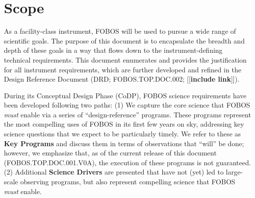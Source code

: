 \documentclass[11pt,a4paper,twoside,onecolumn,openany,final,oldfontcommands]{memoir}
\newcommand{\project}{FOBOS}
\newcommand{\wbs}{TOP}
\newcommand{\doctype}{DOC}
\newcommand{\docnumber}{001}
\newcommand{\docversion}{0A}
\newcommand{\docsysnum}{{\project}.{\wbs}.{\doctype}.{\docnumber}.V{\docversion}}
\newcommand{\edit}[2][todo]{{\color{#1}[[{\bf #2}]]}}
\begin{document}



\section{Scope}

As a facility-class instrument, FOBOS will be used to pursue a wide range of scientific goals.  The purpose of this document is to encapsulate the breadth and depth of these goals in a way that flows down to the instrument-defining technical requirements.  This document enumerates and provides the justification for all instrument requirements, which are further developed and refined in the Design Reference Document (DRD; FOBOS.TOP.DOC.002; \edit{include link}).

During its Conceptual Design Phase (CoDP), FOBOS science requirements have been developed following two paths: (1) We capture the core science that FOBOS {\it must} enable via a series of  ``design-reference'' programs.  These programs represent the most compelling uses of FOBOS in its first few years on sky, addressing key science questions that we expect to be particularly timely.  We refer to these as {\bf Key Programs} and discuss them in terms of observations that ``will'' be done; however, we emphasize that, as of the current release of this document (\docsysnum), the execution of these programs is not guaranteed.  (2) Additional {\bf Science Drivers} are presented that have not (yet) led to large-scale observing programs, but also represent compelling science that FOBOS {\it must} enable.
\end{document}
